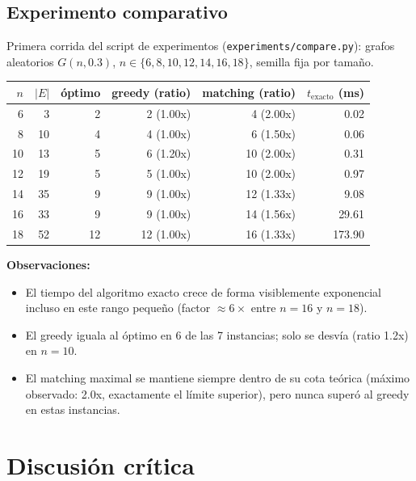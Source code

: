 \documentclass[11pt,a4paper]{article}
\begin{document}
\subsection{Experimento comparativo}
Primera corrida del script de experimentos (\texttt{experiments/compare.py}): grafos
aleatorios $G(n, 0.3)$, $n \in \{6, 8, 10, 12, 14, 16, 18\}$, semilla fija por tamaño.

\begin{center}
\begin{tabular}{rrrrrr}
	\toprule
	$n$ & $|E|$ & óptimo & greedy (ratio) & matching (ratio) & $t_{\text{exacto}}$ (ms) \\
	\midrule
	6  & 3  & 2  & 2 (1.00x)  & 4 (2.00x)  & 0.02 \\
	8  & 10 & 4  & 4 (1.00x)  & 6 (1.50x)  & 0.06 \\
	10 & 13 & 5  & 6 (1.20x)  & 10 (2.00x) & 0.31 \\
	12 & 19 & 5  & 5 (1.00x)  & 10 (2.00x) & 0.97 \\
	14 & 35 & 9  & 9 (1.00x)  & 12 (1.33x) & 9.08 \\
	16 & 33 & 9  & 9 (1.00x)  & 14 (1.56x) & 29.61 \\
	18 & 52 & 12 & 12 (1.00x) & 16 (1.33x) & 173.90 \\
	\bottomrule
\end{tabular}
\end{center}

\textbf{Observaciones:}
\begin{itemize}
	\item El tiempo del algoritmo exacto crece de forma visiblemente exponencial incluso en
	este rango pequeño (factor $\approx 6\times$ entre $n{=}16$ y $n{=}18$).
	\item El greedy iguala al óptimo en 6 de las 7 instancias; solo se desvía (ratio 1.2x)
	en $n{=}10$.
	\item El matching maximal se mantiene siempre dentro de su cota teórica (máximo
	observado: 2.0x, exactamente el límite superior), pero nunca superó al greedy en estas
	instancias.
\end{itemize}

\section{Discusión crítica}
\label{sec:discusion}
\end{document}
